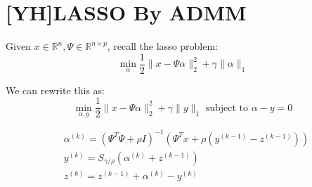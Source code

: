 \section{[YH]LASSO By ADMM}

Given $x \in \mathbb{R}^{n}, \Psi \in \mathbb{R}^{n \times p}$, recall the lasso problem:
$$
\min _{\alpha} \frac{1}{2}\|x-\Psi \alpha\|_{2}^{2}+\gamma\|\alpha\|_{1}
$$



We can rewrite this as:
$$
\min _{\alpha, y} \frac{1}{2}\|x-\Psi \alpha\|_{2}^{2}+\gamma\|y\|_{1} \text { subject to } \alpha-y=0
$$

\begin{align}
    &\alpha^{(k)}=\left(\Psi^{T} \Psi+\rho I\right)^{-1}\left(\Psi^{T} x+\rho\left(y^{(k-1)}-z^{(k-1)}\right)\right) \\
    &y^{(k)}=S_{\gamma / \rho}\left(\alpha^{(k)}+z^{(k-1)}\right) \\
    &z^{(k)}=z^{(k-1)}+\alpha^{(k)}-y^{(k)}
\end{align}


